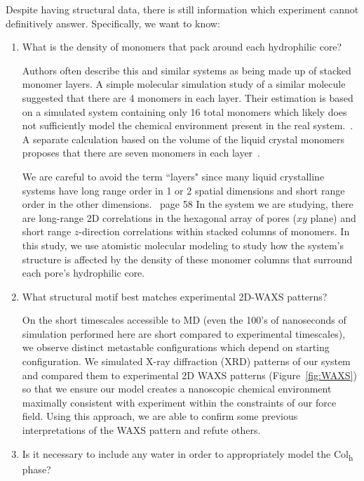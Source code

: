 \documentclass[journal=jpcbfk,manuscript=article]{achemso}
\begin{document}
 Despite having structural data, there is still information which experiment
 cannot definitively answer. Specifically, we want to know:
 \begin{enumerate}
    \item What is the density of monomers that pack around each hydrophilic core? 
    \label{point:monomernum}

	Authors often describe this and similar systems as being made up of
	stacked monomer layers. A simple molecular simulation study of a similar
	molecule suggested that there are 4 monomers in each layer. Their estimation is
	based on a simulated system containing only 16 total monomers which likely does
	not sufficiently model the chemical environment present in the real
	system.~\cite{zhu_methacrylated_2006}. A separate calculation based on the
	volume of the liquid crystal monomers proposes that there are seven monomers in
	each layer~\cite{resel_structural_2000}. 

	We are careful to avoid the term ``layers" since many liquid
	crystalline systems have long range order in 1 or 2 spatial dimensions and
	short range order in the other dimensions.~\cite{chaikin_principles_1995}  %
	page 58 In the system we are studying, there are long-range 2D correlations in
	the hexagonal array of pores ($xy$ plane) and short range $z$-direction
	correlations within stacked columns of monomers. In this study, we use
	atomistic molecular modeling to study how the system's structure is affected by
	the density of these monomer columns that surround each pore's hydrophilic
	core. 

	\item What structural motif best matches experimental 2D-WAXS patterns?\label{point:xrdmatch}

	On the short timescales accessible to MD (even the 100's of nanoseconds
	of simulation performed here are short compared to experimental timescales), we
	observe distinct metastable configurations which depend on starting
	configuration. We simulated X-ray diffraction (XRD) patterns of our system and
	compared them to experimental 2D WAXS patterns (Figure~\ref{fig:WAXS}) so that
	we ensure our model creates a nanoscopic chemical environment maximally
	consistent with experiment within the constraints of our force field. Using
	this approach, we are able to confirm some previous interpretations	of the
	WAXS pattern and refute others. 

        \item Is it necessary to include any water in order to appropriately model the 
        Col\textsubscript{h} phase? \label{point:water}


\end{enumerate}
\end{document}
